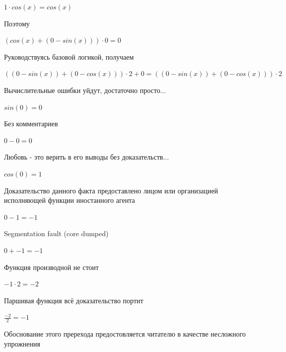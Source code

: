 \documentclass[12pt,a4paper,fleqn]{article}
\begin{document}
\begin{center}
$1 \cdot cos(x) = cos(x)$\end{center}
Поэтому

\begin{center}
$(cos(x)+(0-sin(x))) \cdot 0 = 0$\end{center}
Руководствуясь базовой логикой, получаем

\begin{center}
$((0-sin(x))+(0-cos(x))) \cdot 2+0 = ((0-sin(x))+(0-cos(x))) \cdot 2$\end{center}
Вычислительные ошибки уйдут, достаточно просто...

\begin{center}
\end{center}
\begin{center}$sin(0) = 0$\end{center}
Без комментариев\cite{link4}

\begin{center}
\end{center}
\begin{center}$0-0 = 0$\end{center}
Любовь - это верить в его выводы без доказательств...

\begin{center}
\end{center}
\begin{center}$cos(0) = 1$\end{center}
Доказательство данного факта предоставлено лицом или организацией исполняющей функции иностанного агента

\begin{center}
\end{center}
\begin{center}$0-1 = -1$\end{center}
Segmentation fault (core dumped)

\begin{center}
\end{center}
\begin{center}$0+-1 = -1$\end{center}
Функция производной не стоит\cite{link2}

\begin{center}
\end{center}
\begin{center}$-1 \cdot 2 = -2$\end{center}
Паршивая функция всё доказательство портит\cite{link2}

\begin{center}
\end{center}
\begin{center}$\frac{-2}{2} = -1$\end{center}
Обоснование этого пререхода предостовляется читателю в качестве несложного упрожнения
\end{document}
